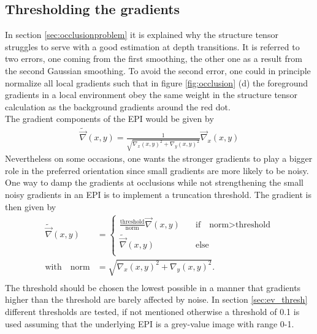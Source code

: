 \documentclass  [
  paper    = a4,
  BCOR     = 10mm,
  twoside,
  fontsize = 12pt,
  fleqn,
  toc      = bibnumbered,
  toc      = listofnumbered,
  numbers  = noendperiod,
  headings = normal,
  listof   = leveldown,
  version  = 3.03
]                                       {scrreprt}
\begin{document}
 \subsection{Thresholding the gradients}
 \label{sec:thresholdinggradients}
 In section \ref{sec:occlusionproblem} it is explained why the structure tensor struggles to serve with a  good estimation at depth transitions. It is referred to two errors, one coming from the first smoothing, the other one as a result from the second Gaussian smoothing. To avoid the second error, one could in principle normalize all local gradients such that in figure \ref{fig:occlusion} (d) the foreground gradients in a local environment obey the same weight in the structure tensor calculation as the background gradients around the red dot.\\
 The gradient components of the EPI would be given by
 \begin{align}
 	\tilde{\vec \nabla}(x,y) = \frac{1}{\sqrt{\nabla_x(x,y)^2 + \nabla_y(x,y)^2}} \vec \nabla_x(x,y)
 \end{align}
 Nevertheless on some occasions, one wants the stronger gradients to play a bigger role in the preferred orientation since small gradients are more likely to be noisy. One way to damp the gradients at occlusions while not strengthening the small noisy gradients in an EPI is to implement a truncation threshold. The gradient is then given by
 \begin{align}
 \tilde{\vec \nabla}(x,y) &= \begin{cases}
\frac{\text{threshold}}{\text{norm}} \vec \nabla(x,y) \quad &\text{if}\quad \text{norm}> \text{threshold}\\
\tilde{\vec \nabla}(x,y)\qquad &\text{else}\\
 \end{cases} \\
\text{with} \quad \text{norm} &= \sqrt{\nabla_x(x,y)^2 + \nabla_y(x,y)^2}.\\
 \end{align}
 The threshold should be chosen the lowest possible in a manner that gradients higher than the threshold are barely affected by noise. In section \ref{sec:ev_thresh} different thresholds are tested, if not mentioned otherwise a threshold of 0.1 is used assuming that the underlying EPI is a grey-value image with range 0-1.\\
 
\end{document}
